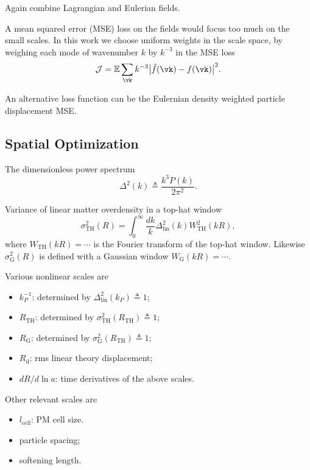 \documentclass[usenatbib]{mnras}
\renewcommand{\d}{d}
\newcommand{\cJ}{\mathcal{J}}
\newcommand{\linear}{\mathrm{lin}}
\newcommand{\tophat}{\mathrm{TH}}
\newcommand{\gauss}{\mathrm{G}}
\begin{document}
Again combine Lagrangian and Eulerian fields.

A mean squared error (MSE) loss on the fields would focus too much on
the small scales. In this work we choose uniform weights in the scale
space, by weighing each mode of wavenumber $k$ by $k^{-3}$ in the MSE
loss
\begin{equation}
  \cJ = \mathbb{E} \sum_\vk k^{-3}
    \bigl| \hat f(\vk) - f(\vk) \bigr|^2.
\end{equation}

An alternative loss function can be the Eulernian density weighted
particle displacement MSE.


\subsection{Spatial Optimization}

The dimensionless power spectrum
%
\begin{equation}
\Delta^2(k) \triangleq \frac{k^3 P(k)}{2 \pi^2}.
\end{equation}

Variance of linear matter overdensity in a top-hat window
%
\begin{equation}
\sigma_\tophat^2(R) = \int_0^\infty \frac{\d k}k
  \Delta_\linear^2(k) W_\tophat^2(kR),
\end{equation}
where $W_\tophat(kR) = \cdots$ is the Fourier transform of the top-hat
window.
Likewise $\sigma_\gauss^2(R)$ is defined with a Gaussian window
$W_\gauss(kR) = \cdots$.


Various nonlinear scales are
\begin{itemize}
\item $k_P^{-1}$: determined by $\Delta_\linear^2(k_P) \triangleq 1$;
\item $R_\tophat$: determined by $\sigma_\tophat^2(R_\tophat) \triangleq
  1$;
\item $R_\gauss$: determined by $\sigma_\gauss^2(R_\tophat) \triangleq
  1$;
\item $R_\mathrm{d}$: rms linear theory displacement;
\item $\d R / \d\ln a$: time derivatives of the above scales.
\end{itemize}

Other relevant scales are
\begin{itemize}
\item $l_\mathrm{cell}$: PM cell size.
\item particle spacing;
\item softening length.
\end{itemize}
\end{document}
